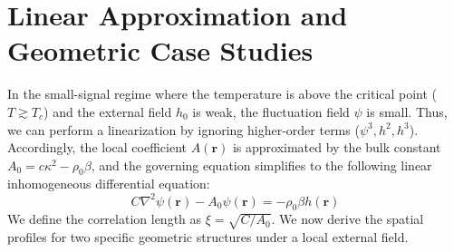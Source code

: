 \documentclass[12pt,a4paper]{article}
\begin{document}
\section{Linear Approximation and Geometric Case Studies}
In the small-signal regime where the temperature is above the critical point ($T \gtrsim T_c$) and the external field $h_0$ is weak, the fluctuation field $\psi$ is small. Thus, we can perform a linearization by ignoring higher-order terms ($\psi^3, h^2, h^3$). Accordingly, the local coefficient $A(\mathbf{r})$ is approximated by the bulk constant $A_0 = c\kappa^2 - \rho_0 \beta$, and the governing equation simplifies to the following linear inhomogeneous differential equation:
\begin{equation}
    C \nabla^2 \psi(\mathbf{r}) - A_0 \psi(\mathbf{r}) = -\rho_0 \beta h(\mathbf{r})
\end{equation}
We define the correlation length as $\xi = \sqrt{C/A_0}$. We now derive the spatial profiles for two specific geometric structures under a local external field.
\end{document}
